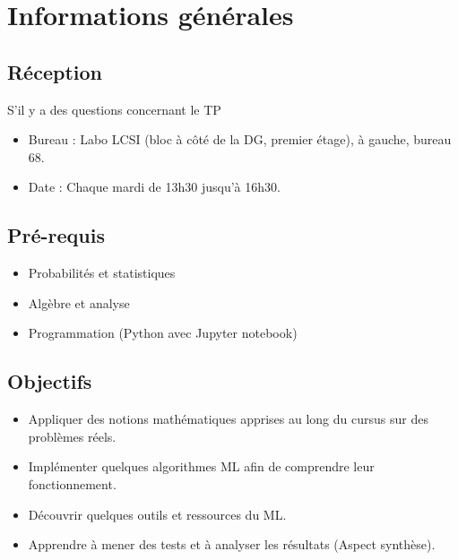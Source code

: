 \documentclass[11pt, a4paper]{article}
\begin{document}
\section{Informations générales}

\begin{minipage}{0.49\textwidth}
	
\subsection{Réception}

S'il y a des questions concernant le TP 
\begin{itemize}
	\item Bureau : Labo LCSI (bloc à côté de la DG, premier étage), à gauche, bureau 68.
	\item Date : Chaque mardi de 13h30 jusqu'à 16h30.
\end{itemize}

\subsection{Pré-requis}

\begin{itemize}
	\item Probabilités et statistiques
	\item Algèbre et analyse 
	\item Programmation (Python avec Jupyter notebook)
\end{itemize}
\end{minipage}
\begin{minipage}{0.49\textwidth}
\subsection{Objectifs}

\begin{itemize}
	\item Appliquer des notions mathématiques apprises au long du cursus sur des problèmes réels.
	\item Implémenter quelques algorithmes ML afin de comprendre leur fonctionnement.
	\item Découvrir quelques outils et ressources du ML.
	\item Apprendre à mener des tests et à analyser les résultats (Aspect synthèse).
\end{itemize}

\end{minipage}
\end{document}

